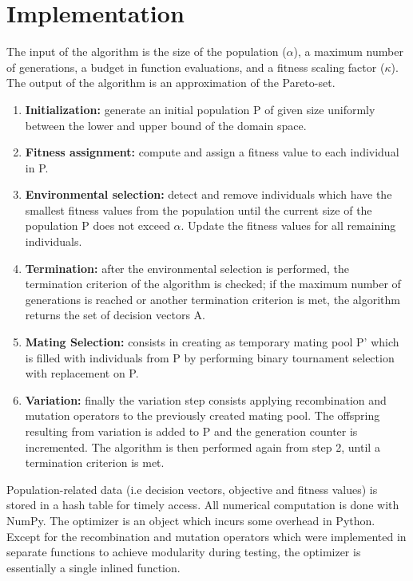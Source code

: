 \documentclass{sig-alternate}
\begin{document}
\section{Implementation}
The input of the algorithm is the size of the population ($\alpha$), a maximum number of generations, a budget in function evaluations, and a fitness scaling factor ($\kappa$). The output of the algorithm is an approximation of the Pareto-set.
\begin{enumerate}
\item \textbf{Initialization:} generate an initial population P of given size uniformly between the lower and upper bound of the domain space.

\item \textbf{Fitness assignment:} compute and assign a fitness value to each individual in P.

\item \textbf{Environmental selection:} detect and remove individuals which have the smallest fitness values from the population until the current size of the population P does not exceed $\alpha$. Update the fitness values for all remaining individuals.

\item \textbf{Termination:} after the environmental selection is performed, the termination criterion of the algorithm is checked; if the maximum number of generations is reached or another termination criterion is met, the algorithm returns the set of decision vectors A.

\item \textbf{Mating Selection:} consists in creating as temporary mating pool P' which is filled with individuals from P by performing binary tournament selection with replacement on P.

\item \textbf{Variation:} finally the variation step consists applying recombination and mutation operators to the previously created mating pool.  
The offspring resulting from variation is added to P and the generation counter is incremented. The algorithm is then performed again from step 2, until a termination criterion is met.

\end{enumerate}

Population-related data (i.e decision vectors, objective and fitness values) is stored in a hash table for timely access. 
All numerical computation is done with NumPy. 
The optimizer is an object which incurs some overhead in Python. Except for the recombination and mutation operators which were implemented in separate functions to achieve modularity during testing, the optimizer is essentially a single inlined function.
\end{document}

